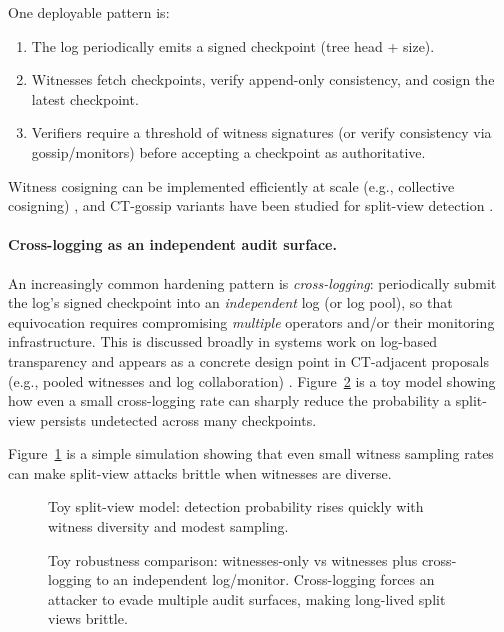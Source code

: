 \documentclass[11pt]{article}
\begin{document}
One deployable pattern is:
\begin{enumerate}
\item The log periodically emits a signed checkpoint (tree head + size).
\item Witnesses fetch checkpoints, verify append-only consistency, and cosign the latest checkpoint.
\item Verifiers require a threshold of witness signatures (or verify consistency via gossip/monitors) before accepting a checkpoint as authoritative.
\end{enumerate}
Witness cosigning can be implemented efficiently at scale (e.g., collective cosigning) \cite{syta2016cosi}, and CT-gossip variants have been studied for split-view detection \cite{dahlberg2018ctgossip}.

\paragraph{Cross-logging as an independent audit surface.}
An increasingly common hardening pattern is \emph{cross-logging}: periodically submit the log's signed checkpoint into an \emph{independent} log (or log pool), so that equivocation requires compromising \emph{multiple} operators and/or their monitoring infrastructure.
This is discussed broadly in systems work on log-based transparency \cite{hicks2023sok_transparency} and appears as a concrete design point in CT-adjacent proposals (e.g., pooled witnesses and log collaboration) \cite{dirksen2021logpicker}.
Figure~\ref{fig:crosslog} is a toy model showing how even a small cross-logging rate can sharply reduce the probability a split-view persists undetected across many checkpoints.

Figure~\ref{fig:split_view} is a simple simulation showing that even small witness sampling rates can make split-view attacks brittle when witnesses are diverse.

\begin{figure}[t]
\centering
{}
\caption{Toy split-view model: detection probability rises quickly with witness diversity and modest sampling.}
\label{fig:split_view}
\end{figure}

\begin{figure}[t]
\centering
{}
\caption{Toy robustness comparison: witnesses-only vs witnesses plus cross-logging to an independent log/monitor.
Cross-logging forces an attacker to evade multiple audit surfaces, making long-lived split views brittle.}
\label{fig:crosslog}
\end{figure}
\end{document}
